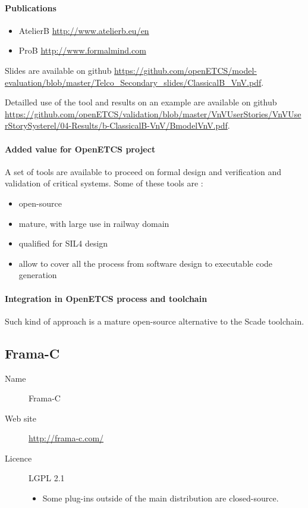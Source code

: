 \paragraph{Publications}

\begin{itemize}
\item AtelierB \url{http://www.atelierb.eu/en}
\item ProB \url{http://www.formalmind.com}

\end{itemize} 

Slides are available on github \url{https://github.com/openETCS/model-evaluation/blob/master/Telco_Secondary_slides/ClassicalB_VnV.pdf}.

Detailled use of the tool and results on an example are available on github \url{https://github.com/openETCS/validation/blob/master/VnVUserStories/VnVUserStorySysterel/04-Results/b-ClassicalB-VnV/BmodelVnV.pdf}.

\paragraph{Added value for OpenETCS project}

A set of tools are available to proceed on formal design and verification and validation of critical systems.
Some of these tools are :
\begin{itemize}
\item open-source
\item mature, with large use in railway domain
\item qualified for SIL4 design 
\item allow to cover all the process from software design to executable code generation
\end{itemize}



\paragraph{Integration in OpenETCS process and toolchain}

Such kind of approach is a mature open-source alternative to the Scade toolchain.

\subsection{Frama-C}\label{sec:frama-c}
\begin{description}
\item[Name] Frama-C
\item[Web site] \url{http://frama-c.com/}
\item[Licence] LGPL 2.1
  \begin{itemize}
    \item Some plug-ins outside of the main distribution are closed-source.
  \end{itemize}
\end{description}

